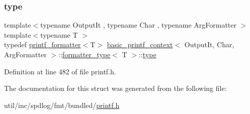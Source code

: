 \subsubsection{\texorpdfstring{type}{type}}
{\footnotesize\ttfamily template$<$typename Output\+It , typename Char , typename Arg\+Formatter $>$ \\
template$<$typename T $>$ \\
typedef \hyperlink{structprintf__formatter}{printf\+\_\+formatter}$<$T$>$ \hyperlink{classbasic__printf__context}{basic\+\_\+printf\+\_\+context}$<$ Output\+It, Char, Arg\+Formatter $>$\+::\hyperlink{structbasic__printf__context_1_1formatter__type}{formatter\+\_\+type}$<$ T $>$\+::\hyperlink{structbasic__printf__context_1_1formatter__type_a2c01e0b65235ce00308de48f6b602f7c}{type}}



Definition at line 482 of file printf.\+h.



The documentation for this struct was generated from the following file\+:\begin{DoxyCompactItemize}
\item 
util/inc/spdlog/fmt/bundled/\hyperlink{printf_8h}{printf.\+h}\end{DoxyCompactItemize}
